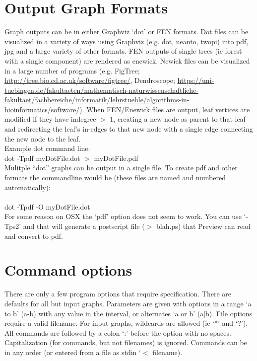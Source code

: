 \documentclass[11pt]{memoir}
\begin{document}
	\section{Output Graph Formats}
	Graph outputs can be in either Graphviz `dot' or FEN formats.  Dot files can be visualized in a variety of ways 
	using Graphviz (e.g. dot, neanto, twopi) into pdf, jpg and a large variety of other formats. FEN outputs of 
	single trees (ie forest with a single component) are rendered as enewick.  Newick files can be visualized in a 
	large number of programs (e.g. FigTree; \url{http://tree.bio.ed.ac.uk/software/figtree/}, Dendroscope; 
	\url{https://uni-tuebingen.de/fakultaeten/mathematisch-naturwissenschaftliche-fakultaet/fachbereiche/informatik/lehrstuehle/algorithms-in-bioinformatics/software/}). 	
	When FEN/Enewick files are output, leaf vertices are modified if they have indegree $>$ 1, creating a new node as parent to that leaf
	and redirecting the leaf's in-edges to that new node with a single edge connecting the new node to the leaf.  
	\bigskip
	\\Example dot command line: \\dot -Tpdf myDotFile.dot $>$ myDotFile.pdf\\
	
	Mulitple ``dot'' graphs can be output in a single file.  To create pdf and 
	other formats the commandline would be (these files are named and numbered automatically):\\\\dot -Tpdf -O myDotFile.dot\\
	
	For some reason on OSX the `pdf' option does not seem to work.  You can use `-Tps2' and that will generate a postscript file ($>$ blah.ps) that Preview can read and convert to pdf.
	
	\section{Command options}
	There are only a few program options that require specification.  There are defaults for all but input graphs.  
	Parameters are given with options in a range `a to b' (a-b) with any value in the interval, or alternates `a or b' (a|b). File options require a valid filename.
	For input graphs, wildcards are allowed (ie `*' and `?').  All commands are followed by a colon `:' before the option with no spaces.  Capitalization (for commands, but not filenames) is ignored.  Commands can be in any order (or entered from a file as stdin `$<$ filename).
	
\end{document}
